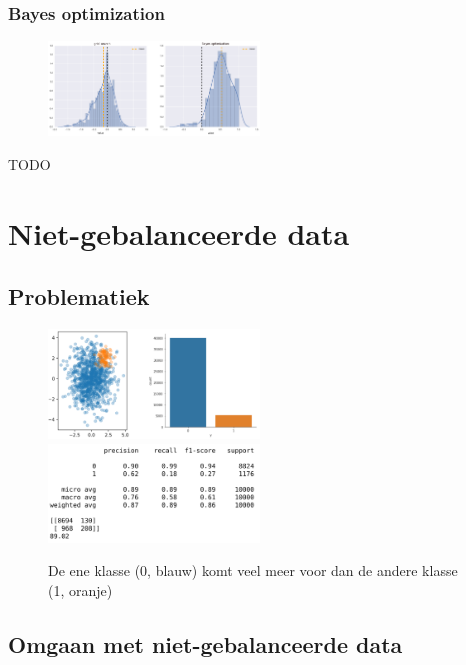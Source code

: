 \documentclass{article}
\begin{document}
\subsubsection{Bayes optimization}

\begin{figure}[H]
    \centering
    \includegraphics[width=0.5\textwidth]{bayes-optimization.png}
    \caption{}
\end{figure}

TODO

\section{Niet-gebalanceerde data}

\subsection{Problematiek}

\begin{figure}[H]
    \centering
    \includegraphics[width=0.5\textwidth]{niet-gebalanceerde-data-problematiek.png}
    \includegraphics[width=0.5\textwidth]{niet-gebalanceerde-data-problematiek2.png}
    \caption{De ene klasse (0, blauw) komt veel meer voor dan de andere klasse (1, oranje)}
\end{figure}


\subsection{Omgaan met niet-gebalanceerde data}
\end{document}
